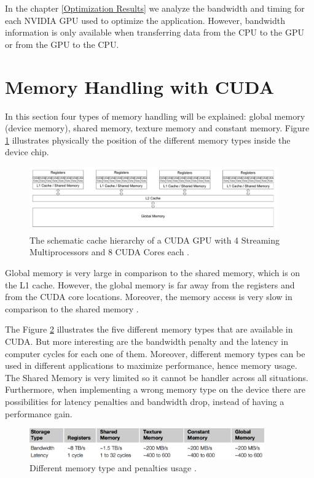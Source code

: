  In the chapter \ref{Optimization Results} we analyze the bandwidth and timing for each NVIDIA GPU used to optimize the application. However, bandwidth information is only available when transferring data from the CPU to the GPU or from the GPU to the CPU.

\section{Memory Handling with CUDA}

In this section four types of memory handling will be explained: global memory (device memory), shared memory, texture memory and constant memory. Figure \ref{fig:cores} illustrates physically the position of the different memory types inside the device chip.

\begin{figure}[htbp]
	\centering
		\includegraphics[width=0.95\textwidth]{Figures/cores.png}
		\smallskip
	\caption[Schematic cache hierarchy of a CUDA GPU]{The schematic cache hierarchy of a CUDA GPU with 4 Streaming Multiprocessors and 8 CUDA Cores each \cite{cook}.}
	\label{fig:cores}
\end{figure}

Global memory is very large in comparison to the shared memory, which is on the L1 cache. However, the global memory is far away from the registers and from the CUDA core locations. Moreover, the memory access is very slow in comparison to the shared memory \cite{cook}.

The Figure \ref{fig:memory} illustrates the five different memory types that are available in CUDA. But more interesting are the bandwidth penalty and the latency in computer cycles for each one of them. Moreover, different memory types can be used in different applications to maximize performance, hence memory usage. The Shared Memory is very limited so it cannot be handler across all situations. Furthermore, when implementing a wrong memory type on the device there are possibilities for latency penalties and bandwidth drop, instead of having a performance gain.
 
\begin{figure}[htbp]
	\centering
		\includegraphics[width=0.9\textwidth]{Figures/memory.png}
		\smallskip
	\caption[Different memory types]{Different memory type and penalties usage \cite{cook}.}
	\label{fig:memory}
\end{figure}

